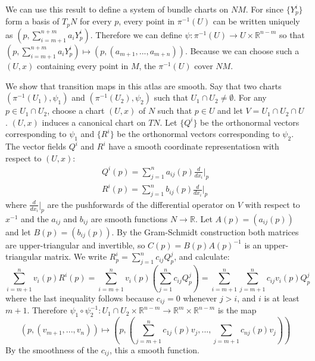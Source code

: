 \documentclass[10pt,letter]{article}
\begin{document}
We can use this result to define a system of bundle charts on $NM$. For since $\lbrace Y^i_p \rbrace$ form a basis of $T_pN$ for every $p$, every point in $\pi^{-1}(U)$ can be written uniquely as $(p,\sum_{i=m+1}^{n+m} a_i Y^i_p)$. Therefore we can define $\psi: \pi^{-1}(U) \rightarrow U \times \mathbb{R}^{n-m}$ so that $(p,\sum_{i=m+1}^{n+m} a_i Y^i_p) \mapsto (p,(a_{m+1},...,a_{m+n}))$. Because we can choose such a $(U,x)$ containing every point in $M$, the $\pi^{-1}(U)$ cover $NM$. 

We show that transition maps in this atlas are smooth. Say that two charts $(\pi^{-1}(U_1),\psi_1)$ and $(\pi^{-1}(U_2),\psi_2)$ such that $U_1 \cap U_2 \neq \emptyset$. For any $p \in U_1 \cap U_2$, choose a chart $(U,x)$ of $N$ such that $p \in U$ and let $V = U_1 \cap U_2 \cap U$. $(U,x)$ induces a canonical chart on $TN$. Let $\lbrace Q^i \rbrace$ be the orthonormal vectors corresponding to $\psi_1$ and $\lbrace R^i \rbrace$ be the orthonormal vectors corresponding to $\psi_2$. The vector fields $Q^i$ and $R^i$ have a smooth coordinate representatiosn with respect to $(U,x)$:
\begin{eqnarray*}
Q^i(p) = \sum_{j=1}^n a_{ij}(p) \frac{d}{dx_i}\bigg\vert_p \\
R^i(p) = \sum_{j=1}^n b_{ij}(p) \frac{d}{dx_i}\bigg\vert_p
\end{eqnarray*}
where $\frac{d}{dx_i}\vert_p$ are the pushforwards of the differential operator on $V$ with respect to $x^{-1}$ and the $a_{ij}$ and $b_{ij}$ are smooth functions $N \rightarrow \mathbb{R}$. Let $A(p) = (a_{ij}(p))$ and let $B(p) = (b_{ij}(p))$. By the Gram-Schmidt construction both matrices are upper-triangular and invertible, so $C(p) = B(p)A(p)^{-1}$ is an upper-triangular matrix. We write $R^i_p = \sum_{j=1}^n c_{ij} Q^j_p$, and calculate:
\begin{equation*}
\sum_{i=m+1}^n v_i(p) R^i(p) = \sum_{i=m+1}^n v_i(p)(\sum_{j=1}^n c_{ij} Q^j_p) = \sum_{i=m+1}^n \sum_{j=m+1}^n c_{ij} v_i(p) Q^j_p
\end{equation*}
where the last inequality follows because $c_{ij} = 0$ whenever $j > i$, and $i$ is at least $m+1$. Therefore $\psi_1 \circ \psi_2^{-1}: U_1 \cap U_2 \times \mathbb{R}^{n-m} \rightarrow \mathbb{R}^m \times \mathbb{R}^{n-m}$ is the map
\begin{equation*}
(p,(v_{m+1},...,v_n)) \mapsto (p,(\sum_{j=m+1}^n c_{1j}(p) v_j,...,\sum_{j=m+1} c_{nj}(p) v_j))
\end{equation*}
By the smoothness of the $c_{ij}$, this a smooth function. 
\end{document}
